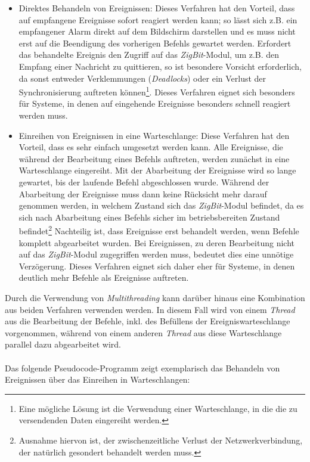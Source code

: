             \begin{itemize}
                \item{Direktes Behandeln von Ereignissen:} Dieses Verfahren hat den Vorteil, dass auf empfangene 
                Ereignisse sofort reagiert werden kann; so lässt sich z.B. ein empfangener Alarm direkt
                auf dem Bildschirm darstellen und es muss nicht erst auf die Beendigung des vorherigen
                Befehls gewartet werden. Erfordert das behandelte Ereignis den Zugriff auf das 
                \emph{ZigBit}-Modul, um z.B. den Empfang einer Nachricht zu quittieren, so ist 
                besondere Vorsicht erforderlich, da sonst entweder Verklemmungen (\emph{Deadlocks}) oder
                ein Verlust der Synchronisierung auftreten können\footnote{Eine mögliche Lösung ist die
                Verwendung einer Warteschlange, in die die zu versendenden Daten eingereiht werden.}.
                Dieses Verfahren eignet sich besonders für Systeme, in denen auf eingehende Ereignisse besonders
                schnell reagiert werden muss.

                \item{Einreihen von Ereignissen in eine Warteschlange:} Diese Verfahren hat den Vorteil, dass
                es sehr einfach umgesetzt werden kann. Alle Ereignisse, die während der Bearbeitung eines Befehls
                auftreten, werden zunächst in eine Warteschlange eingereiht. Mit der Abarbeitung der Ereignisse
                wird so lange gewartet, bis der laufende Befehl abgeschlossen wurde. Während der Abarbeitung der
                Ereignisse muss dann keine Rücksicht mehr darauf genommen werden, in welchem Zustand sich das
                \emph{ZigBit}-Modul befindet, da es sich nach Abarbeitung eines Befehls sicher im betriebsbereiten
                Zustand befindet\footnote{Ausnahme hiervon ist, der zwischenzeitliche Verlust der Netzwerkverbindung,
                    der natürlich gesondert behandelt werden muss.} Nachteilig ist, dass Ereignisse
                erst behandelt werden, wenn Befehle komplett abgearbeitet wurden. Bei Ereignissen, zu deren Bearbeitung
                nicht auf das \emph{ZigBit}-Modul zugegriffen werden muss, bedeutet dies eine unnötige Verzögerung.
                Dieses Verfahren eignet sich daher eher für Systeme, in denen deutlich mehr Befehle als Ereignisse
                auftreten.
            \end{itemize}

            Durch die Verwendung von \emph{Multithreading} kann darüber hinaus eine Kombination aus beiden Verfahren
            verwenden werden. In diesem Fall wird von einem \emph{Thread} aus die Bearbeitung der Befehle, inkl. des
            Befüllens der Ereigniswarteschlange vorgenommen, während von einem anderen \emph{Thread} aus diese Warteschlange
            parallel dazu abgearbeitet wird.\\
            \\
            Das folgende Pseudocode-Programm zeigt exemplarisch das Behandeln von Ereignissen über das Einreihen in
            Warteschlangen:

